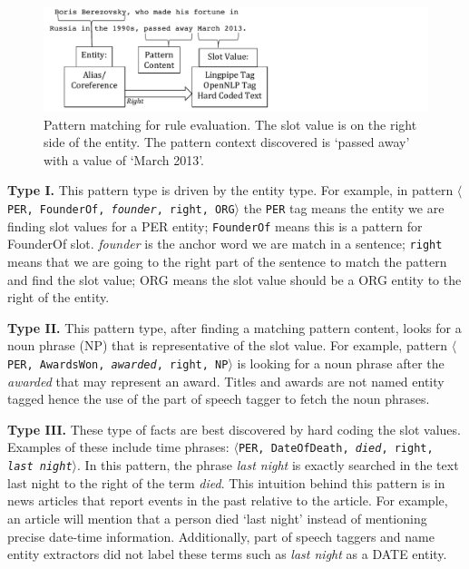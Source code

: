 \begin{figure}
\centering
\includegraphics[width = 13cm]{./images/Pattern-crop.pdf}
\vspace*{-.1in}
\caption{Pattern matching for rule evaluation. The slot value is on the right side of the 
entity. The pattern context discovered is `passed away' with a value of `March 2013'. }\label{fig:pattern}
\vspace*{-.2in}
\end{figure}
 
\textbf{Type I.} This pattern type is driven by the entity type.
For example, in pattern $\langle$\texttt{PER, FounderOf, \textit{founder}, right, ORG}$\rangle$ the \texttt{PER} 
tag means the entity we are finding slot values for a PER entity;
\texttt{FounderOf} means this is a pattern for FounderOf slot.
\textit{founder} is the anchor word we are match in a sentence;
\texttt{right} means that we are going to the right part of the sentence to match the pattern and find the slot value;
ORG means the slot value should be a ORG entity to the right of the entity.

\textbf{Type II.} This pattern type, after finding a matching pattern content, looks for a noun phrase (NP)
that is representative of the slot value.
For example, pattern $\langle$\texttt{PER, AwardsWon, \textit{awarded}, right, NP}$\rangle$
is looking for a noun phrase after the \textit{awarded} that may represent an award.
Titles and awards are not named entity tagged hence the use of the part of speech tagger to fetch the noun phrases.

\textbf{Type III.} These type of facts are best discovered by hard coding the slot values.
Examples of these include time phrases: $\langle$\texttt{PER, DateOfDeath, \textit{died}, right, \textit{last night}}$\rangle$.
In this pattern, the phrase \textit{last night} is exactly searched in the text {last night} to the right of the term \textit{died}.
This intuition behind this pattern is in news articles that report events in the past relative to the article. 
For example, an article will mention that  
a person died `last night' instead of mentioning precise date-time information.
Additionally, part of speech taggers and name entity extractors did not label these terms such as 
\textit{last night} as a DATE entity. 


